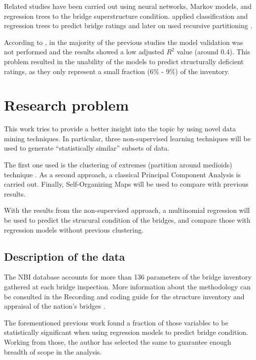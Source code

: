 \documentclass[]{book}
\theoremstyle{definition}
\theoremstyle{definition}
\theoremstyle{definition}
\theoremstyle{remark}
\begin{document}
Related studies have been carried out using neural networks, Markov
models, and regression trees
\citep{veshoskyComparativeAnalysisBridge1994} to the bridge
superstructure condition.
\citet{bektasbasakaldemirUsingClassificationTrees2013} applied
classification and regression trees to predict bridge ratings and later
on used recursive partitioning
\citet{bektasUseRecursivePartitioning2017}.

According to \citet{contreras-nietoCharacterizationSteelBridge2018}, in
the majority of the previous studies the model validation was not
performed and the results showed a low adjusted \(R^2\) value (around
0.4). This problem resulted in the unability of the models to predict
structurally deficient ratings, as they only represent a small fraction
(6\% - 9\%) of the inventory.

\chapter{Research problem}\label{research-problem}

This work tries to provide a better insight into the topic by using
novel data mining techniques. In particular, three non-supervised
learning techniques will be used to generate ``statistically similar''
subsets of data.

The first one used is the clustering of extremes (partition around
medioids) technique \citep{brackenSpatialVariabilitySeasonal2015}. As a
second approach, a classical Principal Component Analysis is carried
out. Finally, Self-Organizing Maps will be used to compare with previous
results.

With the results from the non-supervised approach, a multinomial
regression will be used to predict the strucural condition of the
bridges, and compare those with regression models without previous
clustering.

\section{Description of the data}\label{description-of-the-data}

The NBI database accounts for more than 136 parameters of the bridge
inventory gathered at each bridge inspection. More information about the
methodology can be consulted in the Recording and coding guide for the
structure inventory and appraisal of the nation's bridges
\citet{wesemanRecordingCodingGuide1995}.

The forementioned previous work found a fraction of those variables to
be statistically significant when using regression models to predict
bridge condition. Working from those, the author has selected the same
to guarantee enough breadth of scope in the analysis.
\end{document}
